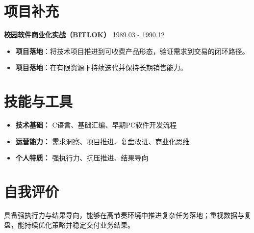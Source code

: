 \documentclass[a4paper,10pt]{article}
\begin{document}
\section*{项目补充}
\textbf{校园软件商业化实战（BITLOK）} \hfill 1989.03 - 1990.12 \\
\begin{itemize}[leftmargin=*, itemsep=2pt, parsep=0pt, topsep=2pt]
    \item \textbf{项目落地}：将技术项目推进到可收费产品形态，验证需求到交易的闭环路径。
    \item \textbf{项目落地}：在有限资源下持续迭代并保持长期销售能力。
\end{itemize}
\section*{技能与工具}
\begin{itemize}[leftmargin=*, itemsep=2pt, parsep=0pt, topsep=2pt]
    \item \textbf{技术基础：} C语言、基础汇编、早期PC软件开发流程
    \item \textbf{运营能力：} 需求洞察、项目推进、复盘改进、商业化思维
    \item \textbf{个人特质：} 强执行力、抗压推进、结果导向
\end{itemize}
\section*{自我评价}
具备强执行力与结果导向，能够在高节奏环境中推进复杂任务落地；重视数据与复盘，能持续优化策略并稳定交付业务结果。
\end{document}
